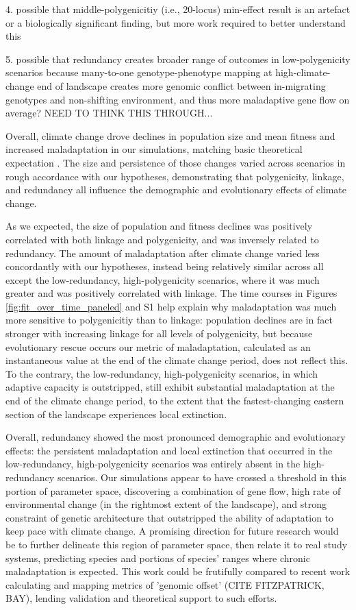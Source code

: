 \documentclass[9pt,twocolumn,twoside,lineno]{pnas-new}
\begin{document}
 4. possible that middle-polygenicitiy (i.e., 20-locus) min-effect result is an artefact or a biologically significant finding, but more work required to better understand this

 5. possible that redundancy creates broader range of outcomes in low-polygenicity scenarios because many-to-one genotype-phenotype mapping at high-climate-change end of landscape creates more genomic conflict between in-migrating genotypes and non-shifting environment, and thus more maladaptive gene flow on average? NEED TO THINK THIS THROUGH...


Overall, climate change drove declines
in population size and mean fitness and increased
maladaptation in our simulations,
matching basic theoretical expectation \cite{aitken_whitlock}.
The size and persistence of those changes varied across scenarios
in rough accordance with our hypotheses, demonstrating that
polygenicity, linkage, and redundancy all influence
the demographic and evolutionary effects of climate change.


As we expected, the size of population and fitness declines was 
positively correlated with both linkage and polygenicity, and was
inversely related to redundancy.
The amount of maladaptation after climate change
varied less concordantly with our hypotheses,
instead being relatively similar across all except the
low-redundancy, high-polygenicity scenarios,
where it was much greater and was positively correlated with linkage.
The time courses in Figures \ref{fig:fit_over_time_paneled} and S1 help explain
why maladaptation was much more sensitive to polygenicitiy than to linkage:
population declines are in fact stronger with increasing linkage for all
levels of polygenicity, but because evolutionary rescue occurs
our metric of maladaptation, calculated as an instantaneous value 
at the end of the climate change period, does not reflect this.
To the contrary, the low-redundancy, high-polygenicity scenarios,
in which adaptive capacity is outstripped,
still exhibit substantial maladaptation at the end of the climate
change period, to the extent that the fastest-changing
eastern section of the landscape experiences local extinction.

Overall, redundancy showed the most pronounced demographic and evolutionary effects:
the persistent maladaptation and local extinction
that occurred in the low-redundancy, high-polygenicity scenarios
was entirely absent in the high-redundancy scenarios.
Our simulations appear to have crossed a threshold in this portion of parameter
space, discovering a combination of gene flow, high rate of environmental change
(in the rightmost extent of the landscape), and strong constraint of
genetic architecture that outstripped the ability of adaptation to keep pace
with climate change. A promising direction for future research
would be to further delineate this region of parameter space,
then relate it to real study systems, predicting species and portions of
species' ranges where chronic maladaptation is expected.
This work could be frutifully compared to recent work calculating
and mapping metrics of 'genomic offset' (CITE FITZPATRICK, BAY),
lending validation and theoretical support to such efforts.
\end{document}
